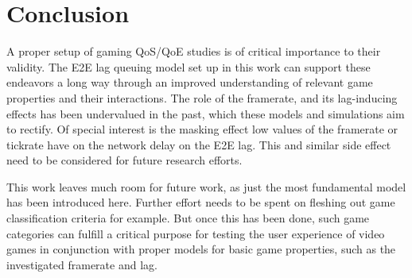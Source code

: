 \section{Conclusion}
\label{sec:conclusion}

A proper setup of gaming \gls{QoS}/\gls{QoE} studies is of critical importance to their validity. The \gls{E2E} lag queuing model set up in this work can support these endeavors a long way through an improved understanding of relevant game properties and their interactions. The role of the framerate, and its lag-inducing effects has been undervalued in the past, which these models and simulations aim to rectify. Of special interest is the masking effect low values of the framerate or tickrate have on the network delay on the \gls{E2E} lag. This and similar side effect need to be considered for future research efforts.


This work leaves much room for future work, as just the most fundamental model has been introduced here. Further effort needs to be spent on fleshing out game classification criteria for example. But once this has been done, such game categories can fulfill a critical purpose for testing the user experience of video games in conjunction with proper models for basic game properties, such as the investigated framerate and lag.
